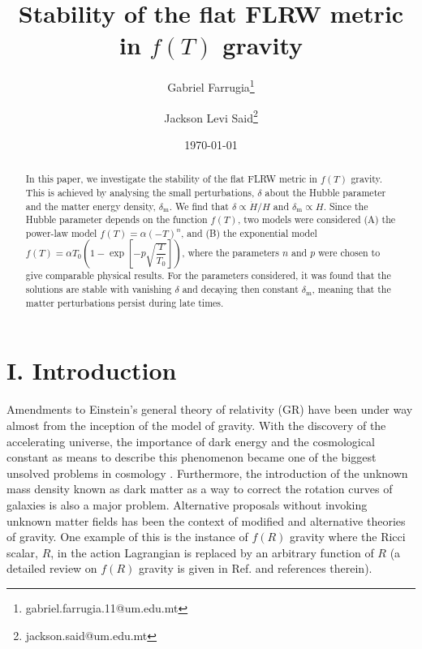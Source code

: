 \documentclass[prl,floatfix,showpacs,twocolumn,preprintnumbers,amsmath,amssymb,superscriptaddress]{revtex4}
\begin{document}
\begin{center}
\title{Stability of the flat FLRW metric in $f(T)$ gravity}
\date{\mydate\today}
\author{Gabriel Farrugia\footnote{gabriel.farrugia.11@um.edu.mt}}
\author{Jackson Levi Said\footnote{jackson.said@um.edu.mt}}

\begin{abstract}
{
In this paper, we investigate the stability of the flat FLRW metric in $f(T)$ gravity. This is achieved by analysing the small perturbations, $\delta$ about the Hubble parameter and the matter energy density, $\delta_\text{m}$. We find that $\delta \propto \dot{H}/H$ and $\delta_{\text{m}} \propto H$. Since the Hubble parameter depends on the function $f(T)$, two models were considered (A) the power-law model $f(T) = \alpha (-T)^n$, and (B) the exponential model $f(T) = \alpha T_0 \left(1 - \exp \left[-p \sqrt{\dfrac{T}{T_0}}\right]\right)$, where the parameters $n$ and $p$ were chosen to give comparable physical results. For the parameters considered, it was found that the solutions are stable with vanishing $\delta$ and decaying then constant $\delta_{\text{m}}$, meaning that the matter perturbations persist during late times.
}
\end{abstract}

\pacs{}

\maketitle

\end{center}

\section{I. Introduction}\label{sec:intro}

Amendments to Einstein's general theory of relativity (GR) have been under way almost from the inception of the model of gravity. With the discovery of the accelerating universe, the importance of dark energy and the cosmological constant as means to describe this phenomenon became one of the biggest unsolved problems in cosmology \cite{Riess:1998cb,Perlmutter:1998np,Hinshaw:2012aka,deSabbata:1990rn,Peebles:2002gy}. Furthermore, the introduction of the unknown mass density known as dark matter as a way to correct the rotation curves of galaxies is also a major problem. Alternative proposals without invoking unknown matter fields has been the context of modified and alternative theories of gravity. One example of this is the instance of $f(R)$ gravity where the Ricci scalar, $R$, in the action Lagrangian is replaced by an arbitrary function of $R$ (a detailed review on $f(R)$ gravity is given in Ref. \cite{DeFelice:2010aj} and references therein). 
\end{document}
